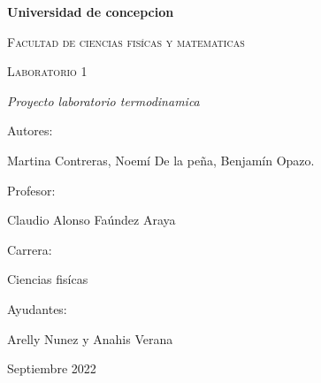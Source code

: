 \documentclass[]{article}
\begin{document}
\begin{titlepage}
      \centering                   %
      {\bfseries\LARGE Universidad de concepcion \par}
      \vspace{1cm}
      {\scshape\Large Facultad de ciencias fisícas y matematicas \par}
      \vspace{2cm}
      {\scshape\Huge Laboratorio 1 \par}
      \vspace{2cm}
      {\itshape\Large Proyecto laboratorio termodinamica \par}
      \vfill
      {\Large Autores: \par}
      {\Large Martina Contreras, Noemí De la peña, Benjamín Opazo. \par}
      \vfill
      \vfill
      {\Large Profesor: \par}
      {\Large Claudio Alonso Faúndez Araya \par}
      \vfill
      \vfill
      {\Large Carrera: \par}
      {\Large Ciencias fisícas \par}
      \vfill
      \vfill
      {\Large Ayudantes: \par}
      {\Large Arelly Nunez y Anahis Verana \par}
      \vfill
      {\Large Septiembre 2022 \par}
      \end{titlepage}

\tableofcontents

\end{document}
